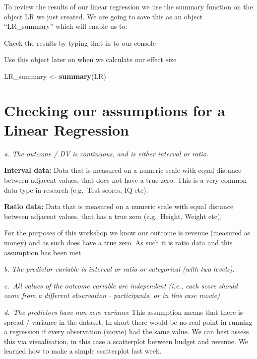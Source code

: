 \documentclass[
]{book}
\newenvironment{Shaded}{\begin{snugshade}}{\end{snugshade}}
\newcommand{\FunctionTok}[1]{\textcolor[rgb]{0.13,0.29,0.53}{\textbf{#1}}}
\newcommand{\NormalTok}[1]{#1}
\newcommand{\OtherTok}[1]{\textcolor[rgb]{0.56,0.35,0.01}{#1}}
\begin{document}
To review the results of our linear regression we use the summary function on the object LR we just created. We are going to save this as an object ``LR\_summary'' which will enable us to:

Check the results by typing that in to our console

Use this object later on when we calculate our effect size

\begin{Shaded}
\begin{Highlighting}[]
\NormalTok{LR\_summary }\OtherTok{\textless{}{-}} \FunctionTok{summary}\NormalTok{(LR)}
\end{Highlighting}
\end{Shaded}

\section{Checking our assumptions for a Linear Regression}\label{checking-our-assumptions-for-a-linear-regression}

\emph{a. The outcome / DV is continuous, and is either interval or ratio.}

\textbf{Interval data:} Data that is measured on a numeric scale with equal distance between adjacent values, that does not have a true zero. This is a very common data type in research (e.g.~Test scores, IQ etc).

\textbf{Ratio data:} Data that is measured on a numeric scale with equal distance between adjacent values, that has a true zero (e.g.~Height, Weight etc).

For the purposes of this workshop we know our outcome is revenue (measured as money) and as such does have a true zero. As such it is ratio data and this assumption has been met

\emph{b. The predictor variable is interval or ratio or categorical (with two levels).}

\emph{c.~All values of the outcome variable are independent (i.e., each score should come from a different observation - participants, or in this case movie)}

\emph{d.~The predictors have non-zero variance} This assumption means that there is spread / variance in the dataset. In short there would be no real point in running a regression if every observation (movie) had the same value. We can best assess this via visualisation, in this case a scatterplot between budget and revenue. We learned how to make a simple scatterplot last week.
\end{document}
